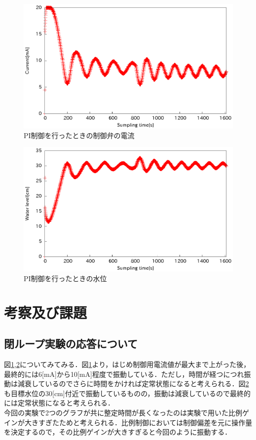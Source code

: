 \documentclass[11pt,a4paper]{jsarticle}
\begin{document}
  \begin{figure}[H]
   \begin{center}
    \includegraphics[scale=.7] {./picture/exp4.eps}
    \caption{PI制御を行ったときの制御弁の電流}
    \label{fig9}
   \end{center}
  \end{figure}

  \begin{figure}[H]
   \begin{center}
    \includegraphics[scale=.7] {./picture/exp4_2.eps}
    \caption{PI制御を行ったときの水位}
    \label{fig10}
   \end{center}
  \end{figure}

 \section{考察及び課題}
  \subsection{閉ループ実験の応答について}
  図\ref{fig9},\ref{fig10}についてみてみる．図\ref{fig9}より，はじめ制御用電流値が最大まで上がった後，最終的には6[mA]から10[mA]程度で振動している．ただし，時間が経つにつれ振動は減衰しているのでさらに時間をかければ定常状態になると考えられる．図\ref{fig10}も目標水位の30[cm]付近で振動しているものの，振動は減衰しているので最終的には定常状態になると考えられる． \\
  今回の実験で2つのグラフが共に整定時間が長くなったのは実験で用いた比例ゲインが大きすぎたためと考えられる．比例制御においては制御偏差を元に操作量を決定するので，その比例ゲインが大きすぎると今回のように振動する．
\end{document}
